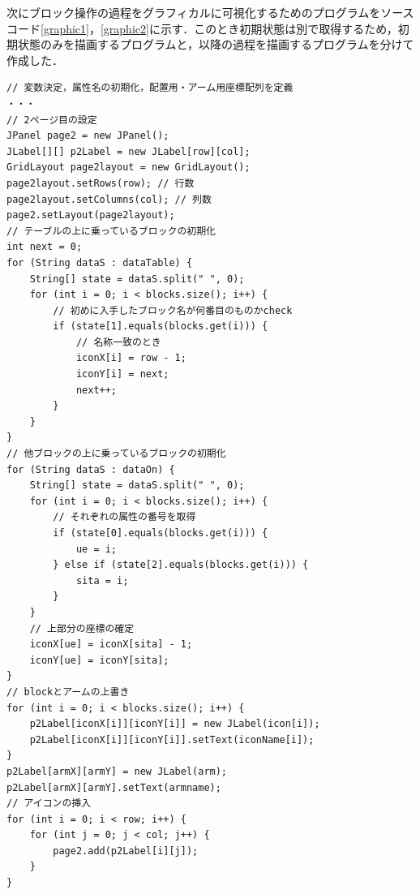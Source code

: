\documentclass[12pt]{jarticle}
\begin{document}
次にブロック操作の過程をグラフィカルに可視化するためのプログラムをソースコード\ref{graphic1}，\ref{graphic2}に示す．このとき初期状態は別で取得するため，初期状態のみを描画するプログラムと，以降の過程を描画するプログラムを分けて作成した．
\begin{lstlisting}[caption=グラフィカル表示1(一部抜粋),label=graphic1]
// 変数決定，属性名の初期化，配置用・アーム用座標配列を定義
・・・
// 2ページ目の設定
JPanel page2 = new JPanel();
JLabel[][] p2Label = new JLabel[row][col];
GridLayout page2layout = new GridLayout();
page2layout.setRows(row); // 行数
page2layout.setColumns(col); // 列数
page2.setLayout(page2layout);
// テーブルの上に乗っているブロックの初期化
int next = 0;
for (String dataS : dataTable) {
	String[] state = dataS.split(" ", 0);
	for (int i = 0; i < blocks.size(); i++) {
		// 初めに入手したブロック名が何番目のものかcheck
		if (state[1].equals(blocks.get(i))) {
			// 名称一致のとき
			iconX[i] = row - 1;
			iconY[i] = next;
			next++;
		}
	}
}
// 他ブロックの上に乗っているブロックの初期化
for (String dataS : dataOn) {
	String[] state = dataS.split(" ", 0);
	for (int i = 0; i < blocks.size(); i++) {
		// それぞれの属性の番号を取得
		if (state[0].equals(blocks.get(i))) {
			ue = i;
		} else if (state[2].equals(blocks.get(i))) {
			sita = i;
		}
	}
	// 上部分の座標の確定
	iconX[ue] = iconX[sita] - 1;
	iconY[ue] = iconY[sita];
}
// blockとアームの上書き
for (int i = 0; i < blocks.size(); i++) {
	p2Label[iconX[i]][iconY[i]] = new JLabel(icon[i]);
	p2Label[iconX[i]][iconY[i]].setText(iconName[i]);
}
p2Label[armX][armY] = new JLabel(arm);
p2Label[armX][armY].setText(armname);
// アイコンの挿入
for (int i = 0; i < row; i++) {
	for (int j = 0; j < col; j++) {
		page2.add(p2Label[i][j]);
	}
}
\end{lstlisting}
\end{document}
